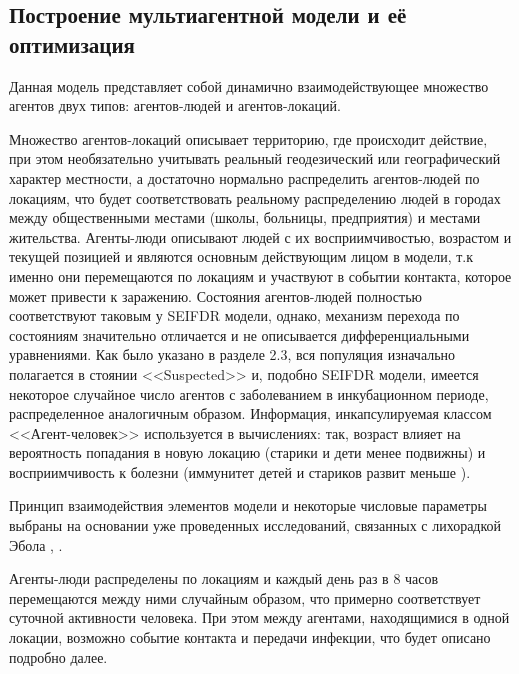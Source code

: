 \subsection{Построение мультиагентной модели и её оптимизация}

Данная модель представляет собой динамично взаимодействующее множество агентов двух типов: агентов-людей и агентов-локаций. 

Множество агентов-локаций описывает территорию, где происходит действие, при этом необязательно учитывать реальный геодезический или географический характер местности, а достаточно нормально распределить агентов-людей по локациям, что будет соответствовать реальному распределению людей в городах между общественными местами (школы, больницы, предприятия) и местами жительства.    Агенты-люди описывают людей с их восприимчивостью, возрастом и текущей позицией и являются основным действующим лицом в модели, т.к именно они перемещаются по локациям и участвуют в событии контакта, которое может привести к заражению. Состояния агентов-людей полностью соответствуют таковым у SEIFDR модели, однако, механизм перехода по состояниям значительно отличается и не описывается дифференциальными уравнениями. Как было указано в разделе 2.3, вся популяция изначально полагается в стоянии  <<Suspected>> и, подобно SEIFDR модели, имеется некоторое случайное число агентов с заболеванием в инкубационном периоде, распределенное аналогичным образом. Информация, инкапсулируемая классом <<Агент-человек>> используется в вычислениях: так, возраст влияет на вероятность попадания в новую локацию (старики и дети менее подвижны) и восприимчивость к болезни (иммунитет детей и стариков развит меньше %
\cite{Parahonsky:2011}).

Принцип взаимодействия элементов модели и некоторые числовые параметры выбраны на основании уже проведенных исследований, связанных с лихорадкой Эбола
\cite{Plos_Outbreak:1}, \cite{Plos_Outbreak:2}. 

Агенты-люди распределены по локациям и каждый день раз в 8 часов перемещаются между ними случайным образом, что примерно соответствует суточной активности  человека. При этом между агентами, находящимися в одной локации, возможно событие контакта  и передачи инфекции, что будет описано подробно далее. 

